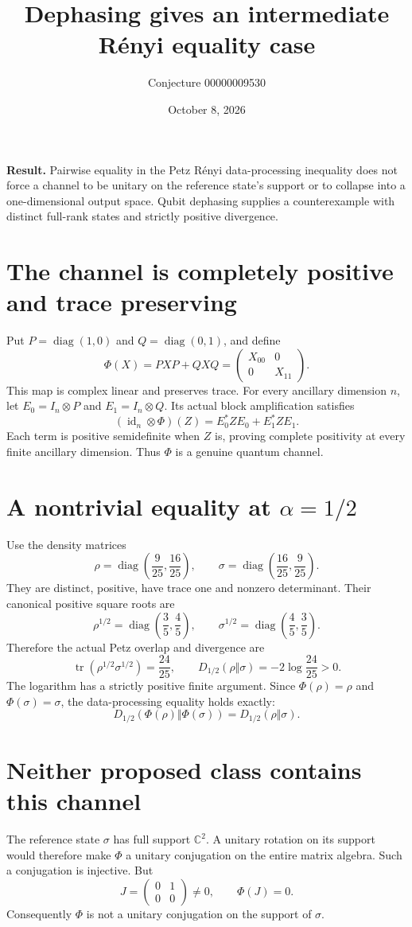 \documentclass[11pt]{article}
\title{Dephasing gives an intermediate R\'enyi equality case}
\author{Conjecture 00000009530}
\date{October 8, 2026}
\begin{document}
\maketitle
\noindent\textbf{Result.} Pairwise equality in the Petz R\'enyi data-processing inequality does not force a channel to be unitary on the reference state's support or to collapse into a one-dimensional output space. Qubit dephasing supplies a counterexample with distinct full-rank states and strictly positive divergence.

\section*{The channel is completely positive and trace preserving}
Put $P=\operatorname{diag}(1,0)$ and $Q=\operatorname{diag}(0,1)$, and define
\[
 \Phi(X)=PXP+QXQ
 =\begin{pmatrix}X_{00}&0\\0&X_{11}\end{pmatrix}.
\]
This map is complex linear and preserves trace. For every ancillary dimension $n$, let $E_0=I_n\otimes P$ and $E_1=I_n\otimes Q$. Its actual block amplification satisfies
\[
 (\operatorname{id}_n\otimes\Phi)(Z)=E_0^*ZE_0+E_1^*ZE_1.
\]
Each term is positive semidefinite when $Z$ is, proving complete positivity at every finite ancillary dimension. Thus $\Phi$ is a genuine quantum channel.

\section*{A nontrivial equality at $\alpha=1/2$}
Use the density matrices
\[
 \rho=\operatorname{diag}\left(\frac9{25},\frac{16}{25}\right),\qquad
 \sigma=\operatorname{diag}\left(\frac{16}{25},\frac9{25}\right).
\]
They are distinct, positive, have trace one and nonzero determinant. Their canonical positive square roots are
\[
 \rho^{1/2}=\operatorname{diag}\left(\frac35,\frac45\right),\qquad
 \sigma^{1/2}=\operatorname{diag}\left(\frac45,\frac35\right).
\]
Therefore the actual Petz overlap and divergence are
\[
 \operatorname{tr}(\rho^{1/2}\sigma^{1/2})=\frac{24}{25},\qquad
 D_{1/2}(\rho\Vert\sigma)=-2\log\frac{24}{25}>0.
\]
The logarithm has a strictly positive finite argument. Since $\Phi(\rho)=\rho$ and $\Phi(\sigma)=\sigma$, the data-processing equality holds exactly:
\[
 D_{1/2}(\Phi(\rho)\Vert\Phi(\sigma))=D_{1/2}(\rho\Vert\sigma).
\]

\newpage
\section*{Neither proposed class contains this channel}
The reference state $\sigma$ has full support $\mathbb C^2$. A unitary rotation on its support would therefore make $\Phi$ a unitary conjugation on the entire matrix algebra. Such a conjugation is injective. But
\[
 J=\begin{pmatrix}0&1\\0&0\end{pmatrix}\ne0,
 \qquad \Phi(J)=0.
\]
Consequently $\Phi$ is not a unitary conjugation on the support of $\sigma$.
\end{document}
